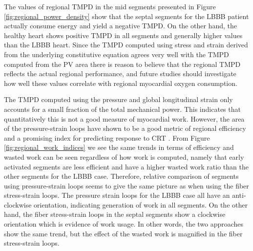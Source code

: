 The values of regional TMPD in the mid segments presented
in Figure \ref{fig:regional_power_density} show that the septal
segments for the LBBB patient actually consume energy and yield a
negative TMPD. On the other hand, the healthy heart shows positive TMPD
in all segments and generally higher values than the LBBB heart.
Since the TMPD computed using stress and strain derived from the
underlying constitutive equation agrees very well with the TMPD
computed from the PV area there is reason to believe that the regional
TMPD reflects the actual regional performance, and future studies should
investigate how well these values correlate with regional myocardial
oxygen consumption. 

The TMPD computed using the pressure and global longitudinal strain
only accounts for a small fraction of the total mechanical power.
This indicates that quantitatively this is not a good measure of
myocardial work. However, the area of the pressure-strain loops have shown to be a good metric
of regional efficiency and a promising index for predicting response
to CRT \cite{vecera2016wasted}. From Figure
\ref{fig:regional_work_indices} we see the same trends in terms of efficiency and wasted
work can be seen regardless of how work is computed, namely that early
activated segments are less efficient and have a higher wasted work
ratio than the other segments for the LBBB case. Therefore, relative
comparison of segments using pressure-strain loops seems to give the
same picture as when using the fiber stress-strain loops. 
The pressure strain loops for the LBBB case all have an
anti-clockwise orientation, indicating generation of work in all
segments. On the other hand, the fiber stress-strain loops in the
septal segments show a clockwise orientation which is evidence of
work usage. In other words, the two approaches show the same
trend, but the effect of the wasted work is magnified in the fiber
stress-strain loops.  



